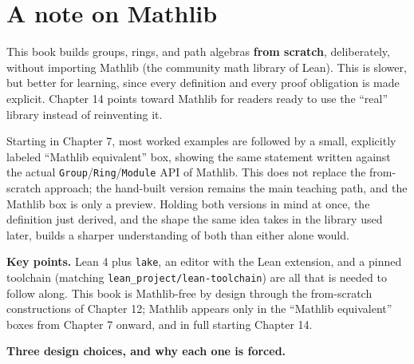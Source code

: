 \section{A note on Mathlib}\label{sec:00-setup:04-mathlib-note:1}

This book builds groups, rings, and path algebras \textbf{from scratch}, deliberately, without importing Mathlib (the community math library of Lean). This is slower, but better for learning, since every definition and every proof obligation is made explicit. Chapter 14 points toward Mathlib for readers ready to use the ``real'' library instead of reinventing it.

Starting in Chapter 7, most worked examples are followed by a small, explicitly labeled ``Mathlib equivalent'' box, showing the same statement written against the actual \texttt{Group}/\texttt{Ring}/\texttt{Module} API of Mathlib. This does not replace the from-scratch approach; the hand-built version remains the main teaching path, and the Mathlib box is only a preview. Holding both versions in mind at once, the definition just derived, and the shape the same idea takes in the library used later, builds a sharper understanding of both than either alone would.

\textbf{Key points.} Lean 4 plus \texttt{lake}, an editor with the Lean extension, and a pinned toolchain (matching \texttt{lean\_\allowbreak{}project/\allowbreak{}lean-\allowbreak{}toolchain}) are all that is needed to follow along. This book is Mathlib-free by design through the from-scratch constructions of Chapter 12; Mathlib appears only in the ``Mathlib equivalent'' boxes from Chapter 7 onward, and in full starting Chapter 14.

\textbf{Three design choices, and why each one is forced.}

